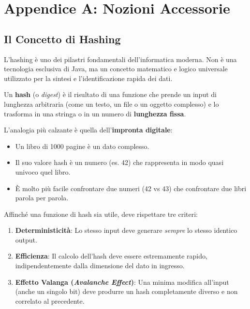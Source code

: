 \chapter{Appendice A: Nozioni Accessorie}

\section{Il Concetto di Hashing}
\label{app:hashing}

L'hashing è uno dei pilastri fondamentali dell'informatica moderna. Non è una tecnologia esclusiva di Java, ma un concetto matematico e logico universale utilizzato per la sintesi e l'identificazione rapida dei dati.

Un \textbf{hash} (o \textit{digest}) è il risultato di una funzione che prende un input di lunghezza arbitraria (come un testo, un file o un oggetto complesso) e lo trasforma in una stringa o in un numero di \textbf{lunghezza fissa}.

L'analogia più calzante è quella dell'\textbf{impronta digitale}:
\begin{itemize}
    \item Un libro di 1000 pagine è un dato complesso.
    \item Il suo valore hash è un numero (es. 42) che rappresenta in modo quasi univoco quel libro.
    \item È molto più facile confrontare due numeri (42 vs 43) che confrontare due libri parola per parola.
\end{itemize}

Affinché una funzione di hash sia utile, deve rispettare tre criteri:
\begin{enumerate}
    \item \textbf{Deterministicità}: Lo stesso input deve generare \textit{sempre} lo stesso identico output.
    \item \textbf{Efficienza}: Il calcolo dell'hash deve essere estremamente rapido, indipendentemente dalla dimensione del dato in ingresso.
    \item \textbf{Effetto Valanga (\textit{Avalanche Effect})}: Una minima modifica all'input (anche un singolo bit) deve produrre un hash completamente diverso e non correlato al precedente.
\end{enumerate}

